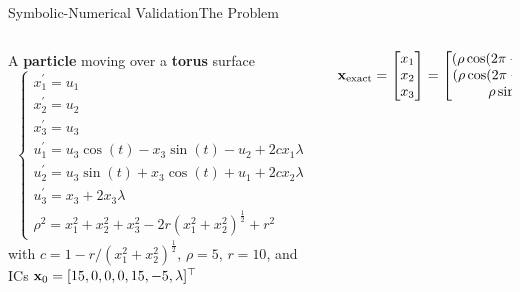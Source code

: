 \begin{frame}{Symbolic-Numerical Validation}{The Problem}
  \begin{columns}
    \begin{column}[c]{0.425\textwidth}
      A \textbf{particle} moving over a \textbf{torus} surface
      \begin{equation*}
        \begin{cases}
          x^{\prime}_{1} = u_{1} \\
          x^{\prime}_{2} = u_{2} \\
          x^{\prime}_{3} = u_{3} \\
          u^{\prime}_{1} = u_{3}\cos(t) - x_{3}\sin(t) - u_{2} + 2 c x_{1}\lambda \\
          u^{\prime}_{2} = u_{3}\sin(t) + x_{3}\cos(t) + u_{1} + 2 c x_{2}\lambda \\
          u^{\prime}_{3} = x_{3} + 2x_{3}\lambda \\
          \rho^2 = x_{1}^2 + x_{2}^2 + x_{3}^2 - 2r(x_{1}^2 + x_{2}^2)^{\frac{1}{2}} + r^2
        \end{cases}
      \end{equation*}
      with $c = 1 - r/(x_{1}^2 + x_{2}^2)^{\frac{1}{2}}$, $\rho = 5$, $r = 10$, and ICs $\mathbf{x}_{0} = [15, 0, 0, 0, 15, -5, \lambda]^{\top}$
    \end{column}
    \begin{column}[c]{0.575\textwidth}
      \begin{equation*}
        \mathbf{x}_\text{exact} = \begin{bmatrix}
          x_{1} \\ x_{2} \\ x_{3}
        \end{bmatrix} = \begin{bmatrix}
          (\rho \cos(2\pi - t) + r) \cos(t) \\
          (\rho \cos(2\pi - t) + r) \sin(t) \\
          \rho \sin(2\pi - t)
        \end{bmatrix}
      \end{equation*} \\
    \end{column}
  \end{columns}
  \vspace{0.5em}
  \scriptsize{}
\end{frame}

